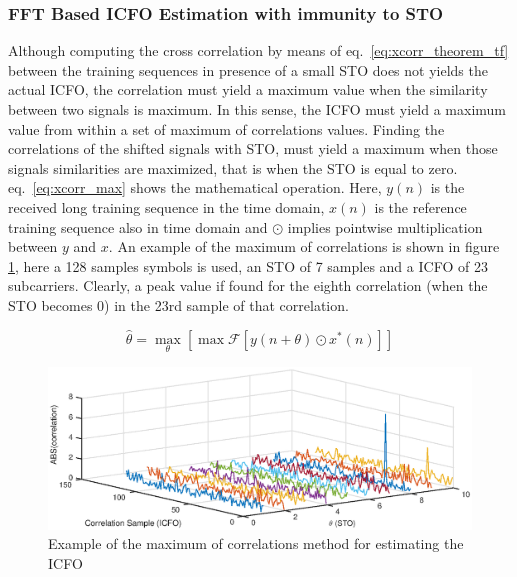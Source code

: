 \subsubsection{FFT Based ICFO Estimation with immunity to STO}
Although computing the cross correlation by means of eq.~\ref{eq:xcorr_theorem_tf} between the training sequences in presence of a small STO does not yields the actual ICFO, the correlation must yield a maximum value when the similarity between two signals is maximum. In this sense, the ICFO must yield a maximum value from within a set of maximum of correlations values. Finding the correlations of the shifted signals with STO, must yield a maximum when those signals similarities are maximized, that is when the STO is equal to zero. eq.~\ref{eq:xcorr_max} shows the mathematical operation. Here, $y(n)$ is the received long training sequence in the time domain, $x(n)$ is the reference training sequence also in time domain and $\odot$ implies pointwise multiplication between $y$ and $x$. An example of the maximum of correlations is shown in figure \ref{fig:xcorrmax_example}, here a 128 samples symbols is used, an STO of 7 samples and a ICFO of 23 subcarriers. Clearly, a peak value if found for the eighth correlation (when the STO becomes 0) in the 23rd sample of that correlation. 



\begin{equation} 
\hat{\theta} = \max\limits_{\theta} [ \max { \mathcal{F}[y(n+\theta) \odot x^{*}(n)] }  ]
\label{eq:xcorr_max}
\end{equation}

\begin{figure}[hbt]
  \centering
    \includegraphics[width=1\textwidth]
      {./figures/max_corre_example}
  \caption{Example of the maximum of correlations method for estimating the ICFO }
  \label{fig:xcorrmax_example}
\end{figure}


